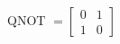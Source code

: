\documentclass[preview]{standalone}
\begin{document}
\begin{center}
QNOT $= \begin{bmatrix} 0 & 1 \\ 1 & 0 \end{bmatrix}$
\end{center}
\end{document}
